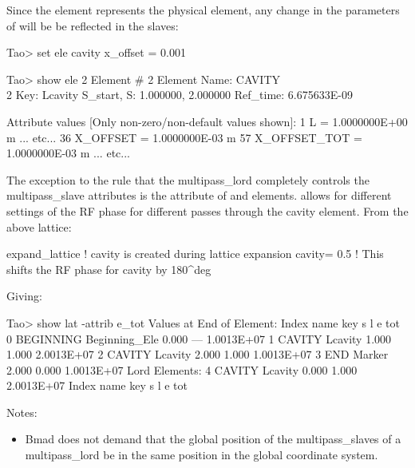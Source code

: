 \documentclass{hitec}
\begin{document}
Since the  element represents the physical element, any change in the parameters of 
will be be reflected in the slaves:
\begin{code}
Tao> set ele cavity x_offset = 0.001

Tao> show ele 2
 Element #                2
 Element Name: CAVITY\\2
 Key: Lcavity
 S_start, S:    1.000000,    2.000000
 Ref_time:  6.675633E-09

 Attribute values [Only non-zero/non-default values shown]:
    1   L                            =  1.0000000E+00 m
... etc...
   36   X_OFFSET                     =  1.0000000E-03 m        57   X_OFFSET_TOT    =  1.0000000E-03 m
... etc...
\end{code}

The exception to the rule that the multipass_lord completely controls the multipass_slave attributes
is the  attribute of  and  elements. 
allows for different settings of the RF phase for different passes through the cavity element.
From the above lattice:
\begin{code}
expand_lattice                 ! cavity\2 is created during lattice expansion
cavity = 0.5 ! This shifts the RF phase for cavity\2 by 180^deg
\end{code}
Giving:
\begin{code}
Tao> show lat -attrib e_tot
      Values at End of Element:
 Index  name      key                      s       l           e
                                                             tot
     0  BEGINNING Beginning_Ele        0.000     ---  1.0013E+07
     1  CAVITY\1  Lcavity              1.000   1.000  2.0013E+07
     2  CAVITY\2  Lcavity              2.000   1.000  1.0013E+07
     3  END       Marker               2.000   0.000  1.0013E+07
Lord Elements:
     4  CAVITY    Lcavity              0.000   1.000  2.0013E+07
 Index  name      key                      s       l           e
                                                             tot
\end{code}

Notes:
\begin{itemize}
\item Bmad does not demand that the global position of the multipass_slaves of a multipass_lord be in
the same position in the global coordinate system.
\end{itemize}
\end{document}
